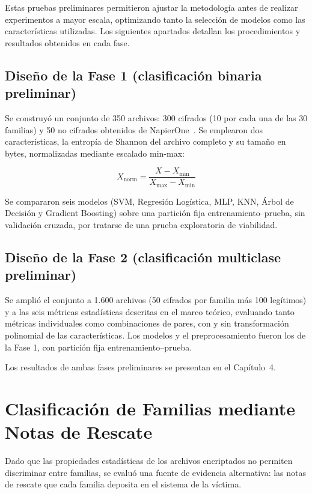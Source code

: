 Estas pruebas preliminares permitieron ajustar la metodología antes de realizar experimentos a mayor escala, optimizando tanto la selección de modelos como las características utilizadas. Los siguientes apartados detallan los procedimientos y resultados obtenidos en cada fase.

\subsection{Diseño de la Fase 1 (clasificación binaria preliminar)}

Se construyó un conjunto de 350 archivos: 300 cifrados (10 por cada una de las 30 familias) y 50 no cifrados obtenidos de NapierOne~\cite{paper_7_napierone}. Se emplearon dos características, la entropía de Shannon del archivo completo y su tamaño en bytes, normalizadas mediante escalado min-max:

\begin{equation}
X_{\text{norm}} = \frac{X - X_{\min}}{X_{\max} - X_{\min}}
\end{equation}

Se compararon seis modelos (SVM, Regresión Logística, MLP, KNN, Árbol de Decisión y Gradient Boosting) sobre una partición fija entrenamiento--prueba, sin validación cruzada, por tratarse de una prueba exploratoria de viabilidad.

\subsection{Diseño de la Fase 2 (clasificación multiclase preliminar)}

Se amplió el conjunto a 1.600 archivos (50 cifrados por familia más 100 legítimos) y a las seis métricas estadísticas descritas en el marco teórico, evaluando tanto métricas individuales como combinaciones de pares, con y sin transformación polinomial de las características. Los modelos y el preprocesamiento fueron los de la Fase 1, con partición fija entrenamiento--prueba.

Los resultados de ambas fases preliminares se presentan en el Capítulo~4.

\section{Clasificación de Familias mediante Notas de Rescate}

Dado que las propiedades estadísticas de los archivos encriptados no permiten discriminar entre familias, se evaluó una fuente de evidencia alternativa: las notas de rescate que cada familia deposita en el sistema de la víctima.

